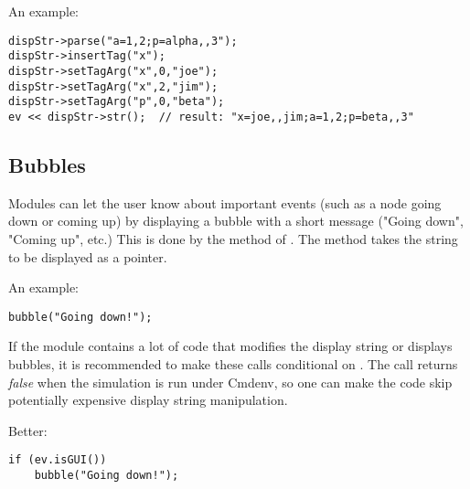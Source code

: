 An example:

\begin{verbatim}
dispStr->parse("a=1,2;p=alpha,,3");
dispStr->insertTag("x");
dispStr->setTagArg("x",0,"joe");
dispStr->setTagArg("x",2,"jim");
dispStr->setTagArg("p",0,"beta");
ev << dispStr->str();  // result: "x=joe,,jim;a=1,2;p=beta,,3"
\end{verbatim}

\subsection{Bubbles}

Modules can let the user know about important events (such as a node
going down or coming up) by displaying a bubble with a short message
("Going down", "Coming up", etc.) This is done by the  method
of . The method takes the string to be displayed
as a  pointer.

An example:
\begin{verbatim}
bubble("Going down!");
\end{verbatim}

If the module contains a lot of code that modifies the display string or
displays bubbles, it is recommended to make these calls conditional
on . The  call returns \textit{false}
when the simulation is run under Cmdenv, so one can make the code skip
potentially expensive display string manipulation.

Better:
\begin{verbatim}
if (ev.isGUI())
    bubble("Going down!");
\end{verbatim}

